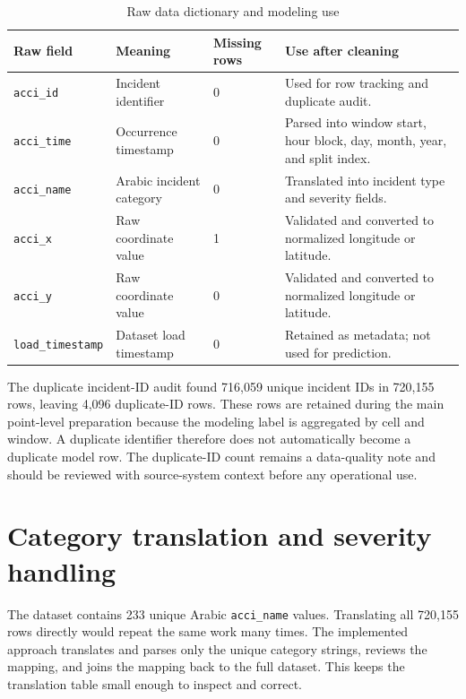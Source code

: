 \begin{table}[H]
\centering
\caption{Raw data dictionary and modeling use}
\label{tab:raw_data_dictionary}
\small
\begin{tabularx}{\textwidth}{L{0.20\textwidth}L{0.24\textwidth}L{0.16\textwidth}Y}
\toprule
\textbf{Raw field} & \textbf{Meaning} & \textbf{Missing rows} & \textbf{Use after cleaning} \\
\midrule
\texttt{acci\_id} & Incident identifier & 0 & Used for row tracking and duplicate audit. \\
\texttt{acci\_time} & Occurrence timestamp & 0 & Parsed into window start, hour block, day, month, year, and split index. \\
\texttt{acci\_name} & Arabic incident category & 0 & Translated into incident type and severity fields. \\
\texttt{acci\_x} & Raw coordinate value & 1 & Validated and converted to normalized longitude or latitude. \\
\texttt{acci\_y} & Raw coordinate value & 0 & Validated and converted to normalized longitude or latitude. \\
\texttt{load\_timestamp} & Dataset load timestamp & 0 & Retained as metadata; not used for prediction. \\
\bottomrule
\end{tabularx}
\end{table}

The duplicate incident-ID audit found 716,059 unique incident IDs in 720,155 rows, leaving 4,096 duplicate-ID rows. These rows are retained during the main point-level preparation because the modeling label is aggregated by cell and window. A duplicate identifier therefore does not automatically become a duplicate model row. The duplicate-ID count remains a data-quality note and should be reviewed with source-system context before any operational use.

\section{Category translation and severity handling}

The dataset contains 233 unique Arabic \texttt{acci\_name} values. Translating all 720,155 rows directly would repeat the same work many times. The implemented approach translates and parses only the unique category strings, reviews the mapping, and joins the mapping back to the full dataset. This keeps the translation table small enough to inspect and correct.

